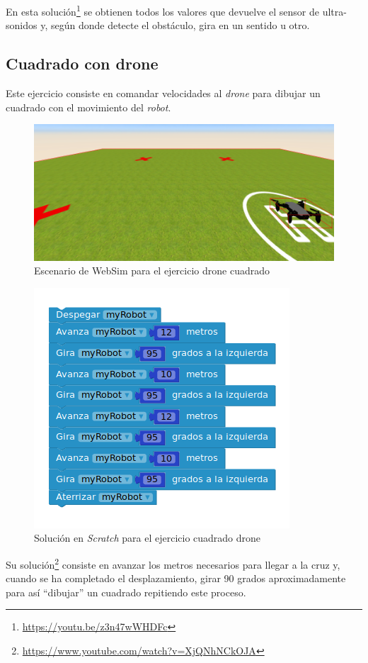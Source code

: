     En esta solución\footnote{\url{https://youtu.be/z3n47wWHDFc}} se obtienen todos los valores que devuelve el sensor de ultra-sonidos y, según donde detecte el obstáculo, gira en un sentido u otro.

\subsection{Cuadrado con drone}
Este ejercicio consiste en comandar velocidades al \textit{drone} para dibujar un cuadrado con el movimiento del \textit{robot}.

    \begin{figure}[H]
        \centering
        \includegraphics[scale=0.4]{img/cuadradoDrone.png}
        \caption{Escenario de WebSim para el ejercicio drone cuadrado} 
        \label{fig:droneCuadrado}
    \end{figure}

    \begin{figure}[H]
    \centering
    \includegraphics[scale=0.5]{img/tellocuadradocodigo.png}
    \caption{Solución en \textit{Scratch} para el ejercicio cuadrado drone} 
    \label{fig:cuadradoSolution}
    \end{figure}
    Su solución\footnote{\url{https://www.youtube.com/watch?v=XjQNhNCkOJA}} consiste en avanzar los metros necesarios para llegar a la cruz y, cuando se ha completado el desplazamiento, girar 90 grados aproximadamente para así ``dibujar'' un cuadrado repitiendo este proceso.
    
